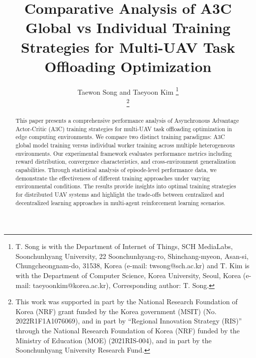 \documentclass[journal]{IEEEtran}
\begin{document}
\title{Comparative Analysis of A3C Global vs Individual Training Strategies for Multi-UAV Task Offloading Optimization}

\author{Taewon Song and Taeyoon Kim
\thanks{T. Song is with the Department of Internet of Things, SCH \mbox{MediaLabs}, Soonchunhyang University, 22 Soonchunhyang-ro, Shinchang-myeon, Asan-si, Chungcheongnam-do, 31538, Korea (e-mail: twsong@sch.ac.kr) and T. Kim is with the Department of Computer Science, Korea University, Seoul, Korea (e-mail: taeyoonkim@korea.ac.kr), Corresponding author: T. Song.}%

\thanks{This work was supported in part by the National Research Foundation of Korea (NRF) grant funded by the Korea government (MSIT) (No. 2022R1F1A1076069), and in part by ``Regional Innovation Strategy (RIS)'' through the National Research Foundation of Korea (NRF) funded by the Ministry of Education (MOE) (2021RIS-004), and in part by the Soonchunhyang University Research Fund.}
}

{}

\maketitle

\begin{abstract}
This paper presents a comprehensive performance analysis of Asynchronous Advantage Actor-Critic (A3C) training strategies for multi-UAV task offloading optimization in edge computing environments. We compare two distinct training paradigms: A3C global model training versus individual worker training across multiple heterogeneous environments. Our experimental framework evaluates performance metrics including reward distribution, convergence characteristics, and cross-environment generalization capabilities. Through statistical analysis of episode-level performance data, we demonstrate the effectiveness of different training approaches under varying environmental conditions. The results provide insights into optimal training strategies for distributed UAV systems and highlight the trade-offs between centralized and decentralized learning approaches in multi-agent reinforcement learning scenarios.
\end{abstract}
\end{document}
